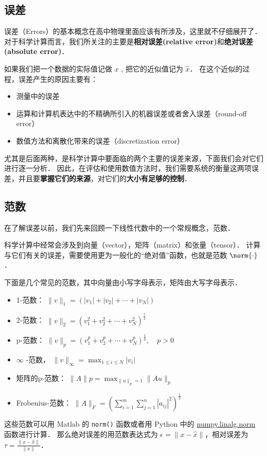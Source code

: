 
\subsection{误差}
误差（Errors）的基本概念在高中物理里面应该有所涉及，这里就不仔细展开了． 对于科学计算而言，我们所关注的主要是\textbf{相对误差(relative error)}和\textbf{绝对误差(absolute error)}．

如果我们把一个数据的实际值记做 $x$ , 把它的近似值记为 $\hat x$． 在这个近似的过程，误差产生的原因主要有：
\begin{itemize}
\item 测量中的误差
\item 运算和计算机表达中的不精确所引入的机器误差或者舍入误差（round-off error）
\item 数值方法和离散化带来的误差（discretization error）
\end{itemize}
尤其是后面两种，是科学计算中要面临的两个主要的误差来源，下面我们会对它们进行逐一分析． 因此，在评估和使用数值方法时，我们需要系统的衡量这两项误差，并且要\textbf{掌握它们的来源}，对它们的\textbf{大小有足够的控制}．

\subsection{范数}
在了解误差以前，我们先来回顾一下线性代数中的一个常规概念，范数．

科学计算中经常会涉及到向量（vector），矩阵（matrix）和张量（tensor）． 计算与它们有关的误差，需要使用更为一般化的“绝对值”函数，也就是范数 $\norm{\cdot}$．

下面是几个常见的范数，其中向量由小写字母表示，矩阵由大写字母表示．
\begin{itemize}
\item 1-范数：  $\|v\|_1=(|v_1|+|v_2|+\cdots+|v_N|)$
\item 2-范数：  $\|v\|_2=(v_1^2+v_2^2+\cdots+v_N^2)^{\frac{1}{2}}$
\item p-范数：  $\|v\|_p=(v_1^p+v_2^p+\cdots+v_N^p)^{\frac{1}{p}},\quad p>0$
\item $\infty$  -范数，  $\|v\|_{\infty}=\max_{1\le i \le N}|v_i|$
\item 矩阵的p-范数：  $\|A\|p=\max_{\|u\|_p=1}\|Au\|_p$
\item Frobenius-范数：  $\|A\|_F=(\sum_{i=1}^m\sum_{j=1}^n|a_{ij}|^2)^{\frac{1}{2}}$
\end{itemize}

这些范数可以用 Matlab 的 \verb|norm()| 函数或者用 Python 中的 \href{https://docs.scipy.org/doc/numpy/reference/generated/numpy.linalg.norm.html}{numpy.linalg.norm} 函数进行计算． 那么绝对误差的用范数表达式为 $\epsilon=\|x-\hat{x}\|$，相对误差为  $\tau=\frac{\|x-\hat{x}\|}{\|x\|}$．

